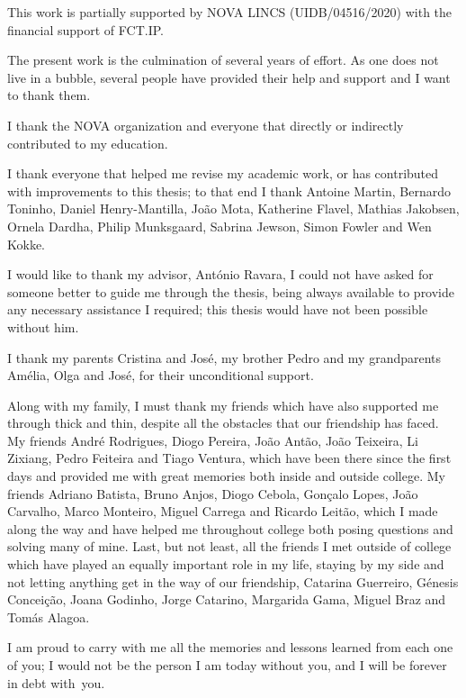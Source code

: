 

\begin{ntacknowledgements}

This work is partially supported by NOVA LINCS (UIDB/04516/2020) with the financial support of FCT.IP.

The present work is the culmination of several years of effort. As one does not live in a bubble,
several people have provided their help and support and I want to thank them.

I thank the NOVA organization and everyone that directly or indirectly contributed to my education.

I thank everyone that helped me revise my academic work, or has contributed with improvements to this thesis;
to that end I thank Antoine Martin, Bernardo Toninho, Daniel Henry-Mantilla, João Mota,
Katherine Flavel, Mathias Jakobsen, Ornela Dardha, Philip Munksgaard, Sabrina Jewson, Simon Fowler and Wen Kokke.

I would like to thank my advisor, António Ravara,
I could not have asked for someone better to guide me through the thesis,
being always available to provide any necessary assistance I required;
this thesis would have not been possible without him.

I thank my parents Cristina and José, my brother Pedro and my grandparents Amélia, Olga and José,
for their unconditional support.

Along with my family, I must thank my friends which have also supported me through thick and thin,
despite all the obstacles that our friendship has faced.
My friends André Rodrigues, Diogo Pereira, João Antão, João Teixeira, Li Zixiang, Pedro Feiteira and Tiago Ventura,
which have been there since the first days and provided me with great memories both inside and outside college.
My friends Adriano Batista, Bruno Anjos, Diogo Cebola, Gonçalo Lopes, João Carvalho, Marco Monteiro, Miguel Carrega and Ricardo Leitão,
which I made along the way and have helped me throughout college both posing questions and solving many of mine.
Last, but not least, all the friends I met outside of college which have played an equally important role in my life,
staying by my side and not letting anything get in the way of our friendship,
Catarina Guerreiro, Génesis Conceição, Joana Godinho, Jorge Catarino, Margarida Gama, Miguel Braz and Tomás Alagoa.

I am proud to carry with me all the memories and lessons learned from each one of you;
I would not be the person I am today without you, and I will be forever in debt with~you.

\end{ntacknowledgements}